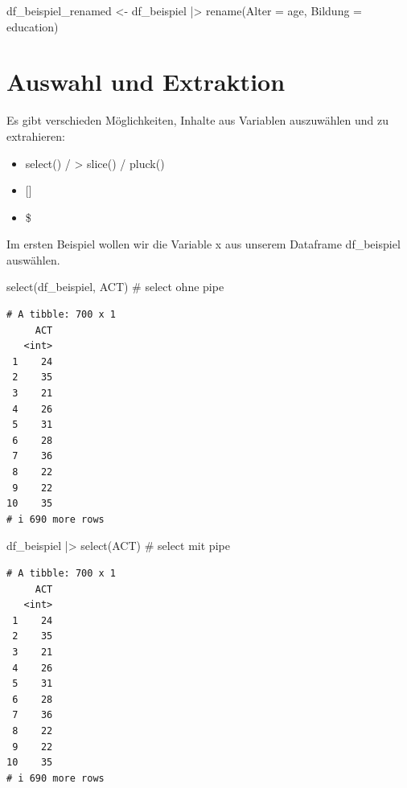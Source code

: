 \documentclass[
  letterpaper,
  DIV=11,
  numbers=noendperiod]{scrreprt}
\newenvironment{Shaded}{\begin{snugshade}}{\end{snugshade}}
\newcommand{\AttributeTok}[1]{\textcolor[rgb]{0.40,0.45,0.13}{#1}}
\newcommand{\CommentTok}[1]{\textcolor[rgb]{0.37,0.37,0.37}{#1}}
\newcommand{\FunctionTok}[1]{\textcolor[rgb]{0.28,0.35,0.67}{#1}}
\newcommand{\NormalTok}[1]{\textcolor[rgb]{0.00,0.23,0.31}{#1}}
\newcommand{\OtherTok}[1]{\textcolor[rgb]{0.00,0.23,0.31}{#1}}
\newcommand{\SpecialCharTok}[1]{\textcolor[rgb]{0.37,0.37,0.37}{#1}}
\providecommand{\tightlist}{%
  \setlength{\itemsep}{0pt}\setlength{\parskip}{0pt}}\usepackage{longtable,booktabs,array}
\begin{document}
\begin{Shaded}
\begin{Highlighting}[]
\NormalTok{df\_beispiel\_renamed }\OtherTok{\textless{}{-}}\NormalTok{ df\_beispiel }\SpecialCharTok{|\textgreater{}} 
  \FunctionTok{rename}\NormalTok{(}\AttributeTok{Alter =}\NormalTok{ age,}
         \AttributeTok{Bildung =}\NormalTok{ education) }
\end{Highlighting}
\end{Shaded}


\chapter{Auswahl und Extraktion}\label{auswahl-und-extraktion}

Es gibt verschieden Möglichkeiten, Inhalte aus Variablen auszuwählen und
zu extrahieren:

\begin{itemize}
\tightlist
\item
  select() / \textbar\textgreater{} slice() / pluck()
\item
  {[}{]}
\item
  \$
\end{itemize}

Im ersten Beispiel wollen wir die Variable x aus unserem Dataframe
df\_beispiel auswählen.

\begin{Shaded}
\begin{Highlighting}[]
\FunctionTok{select}\NormalTok{(df\_beispiel, ACT) }\CommentTok{\# select ohne pipe}
\end{Highlighting}
\end{Shaded}

\begin{verbatim}
# A tibble: 700 x 1
     ACT
   <int>
 1    24
 2    35
 3    21
 4    26
 5    31
 6    28
 7    36
 8    22
 9    22
10    35
# i 690 more rows
\end{verbatim}

\begin{Shaded}
\begin{Highlighting}[]
\NormalTok{df\_beispiel }\SpecialCharTok{|\textgreater{}} \FunctionTok{select}\NormalTok{(ACT) }\CommentTok{\# select mit pipe}
\end{Highlighting}
\end{Shaded}

\begin{verbatim}
# A tibble: 700 x 1
     ACT
   <int>
 1    24
 2    35
 3    21
 4    26
 5    31
 6    28
 7    36
 8    22
 9    22
10    35
# i 690 more rows
\end{verbatim}
\end{document}
